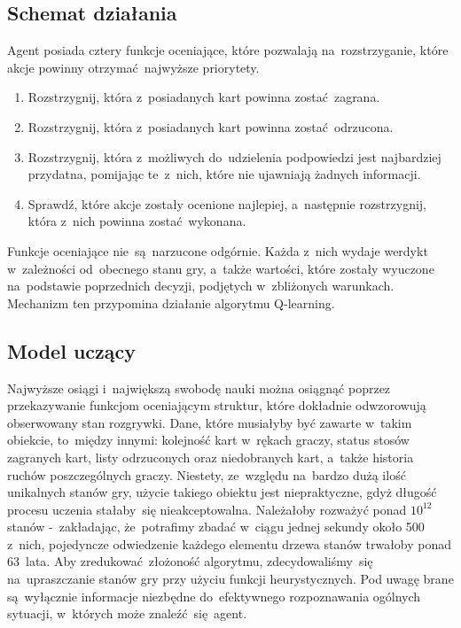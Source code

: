 \documentclass[declaration,shortabstract,inz]{iithesis}
\begin{document}
\subsection*{Schemat działania}

Agent posiada cztery funkcje oceniające, które pozwalają na~rozstrzyganie, które akcje powinny otrzymać najwyższe priorytety.

\begin{enumerate}
	\item Rozstrzygnij, która z~posiadanych kart powinna zostać zagrana.
	\item Rozstrzygnij, która z~posiadanych kart powinna zostać odrzucona.
	\item Rozstrzygnij, która z~możliwych do~udzielenia podpowiedzi jest najbardziej przydatna, pomijając te~z~nich, które nie ujawniają żadnych informacji.
	\item Sprawdź, które akcje zostały ocenione najlepiej, a~następnie rozstrzygnij, która z~nich powinna zostać wykonana.
\end{enumerate}

Funkcje oceniające nie~są~narzucone odgórnie. Każda z~nich wydaje werdykt w~zależności od~obecnego stanu gry, a~także wartości, które zostały wyuczone na~podstawie poprzednich decyzji, podjętych w~zbliżonych warunkach. Mechanizm ten przypomina działanie algorytmu Q-learning.

\subsection*{Model uczący}

Najwyższe osiągi i~największą swobodę nauki można osiągnąć poprzez przekazywanie funkcjom oceniającym struktur, które dokładnie odwzorowują obserwowany stan rozgrywki. Dane, które musiałyby być zawarte w~takim obiekcie, to~między innymi: kolejność kart w~rękach graczy, status stosów zagranych kart, listy odrzuconych oraz niedobranych kart, a~także historia ruchów poszczególnych graczy. Niestety, ze~względu na~bardzo dużą ilość unikalnych stanów gry, użycie takiego obiektu jest niepraktyczne, gdyż długość procesu uczenia stałaby~się nieakceptowalna. Należałoby rozważyć ponad $10^{12}$ stanów -~zakładając, że~potrafimy zbadać w~ciągu jednej sekundy około 500 z~nich, pojedyncze odwiedzenie każdego elementu drzewa stanów trwałoby ponad 63~lata. Aby zredukować złożoność algorytmu, zdecydowaliśmy~się na~upraszczanie stanów gry przy użyciu funkcji heurystycznych. Pod uwagę brane są~wyłącznie informacje niezbędne do~efektywnego rozpoznawania ogólnych sytuacji, w~których może znaleźć~się agent.
\end{document}
